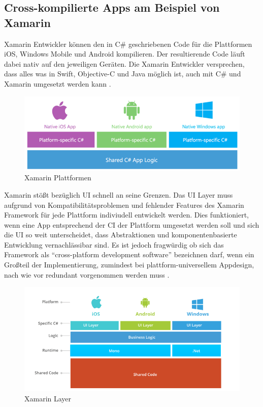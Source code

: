\subsection{Cross-kompilierte Apps am Beispiel von Xamarin}

Xamarin Entwickler können den in C\# geschriebenen Code für die Plattformen iOS, Windows Mobile und Android kompilieren.
Der resultierende Code läuft dabei nativ auf den jeweiligen Geräten.
Die Xamarin Entwickler versprechen, dass alles was in Swift, Objective-C und
Java möglich ist, auch mit C\# und Xamarin umgesetzt werden kann \cite{projectxamarin}.

\begin{figure}[ht]
 \centering
 \includegraphics[width=0.8\linewidth]{kapitel2/csharp_xamarin.png}
 \caption{Xamarin Plattformen \cite{7Reas20:online}}
\end{figure}
\vspace{1cm}

\noindent
Xamarin stößt bezüglich \ac{UI} schnell an seine Grenzen. Das \ac{UI} Layer muss aufgrund von Kompatibilitätsproblemen und fehlender Features des Xamarin Framework
für jede Plattform indiviudell entwickelt werden. Dies funktioniert, wenn eine App entsprechend der \ac{CI} der Plattform umgesetzt werden soll und sich die \ac{UI} so weit unterscheidet,
dass Abstraktionen und komponentenbasierte Entwicklung vernachlässibar sind. Es ist jedoch fragwürdig ob sich das Framework als ``cross-platform development software'' bezeichnen darf,
wenn ein Großteil der Implementierung, zumindest bei plattform-universellem Appdesign, nach wie vor redundant vorgenommen werden muss \cite{7Reas20:online}.

\begin{figure}[ht]
 \centering
 \includegraphics[width=0.8\linewidth]{kapitel2/xamarin_ui_blocker.png}
 \caption{Xamarin Layer \cite{7Reas20:online}}
\end{figure}


